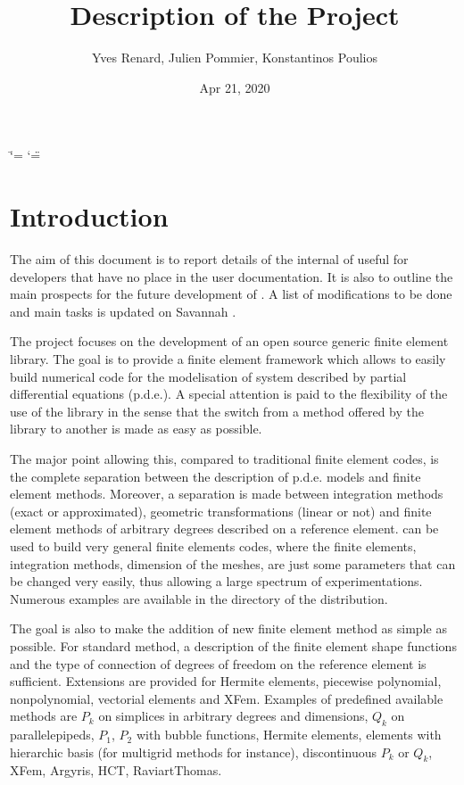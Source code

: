 \documentclass[a4paper,11pt,english]{sphinxmanual}
\title{Description of the Project}
\date{Apr 21, 2020}
\author{Yves Renard, Julien Pommier, Konstantinos Poulios}
\begin{document}
\ifdefined\shorthandoff
  \ifnum\catcode`\=\string=\active\shorthandoff{=}\fi
  \ifnum\catcode`\"=\active{}\fi
\fi

\pagestyle{empty}
\sphinxmaketitle
\pagestyle{plain}
\sphinxtableofcontents
\pagestyle{normal}
\label{\detokenize{project/index::doc}}



\chapter{Introduction}
\label{\detokenize{project/intro:introduction}}\label{\detokenize{project/intro:dp-intro}}\label{\detokenize{project/intro::doc}}
The aim of this document is to report details of the internal of 
useful for developers that have no place in the user documentation.
It is also to outline the main prospects for the future development
of . A list of modifications to be done and main tasks is updated
on Savannah .

The  project focuses on the development of an open source generic
finite element library.
The goal is to provide a finite element framework which allows to
easily build numerical code for the modelisation of system described
by partial differential equations (p.d.e.). A special attention is paid
to the flexibility of the use of the library in the sense that the
switch from a method offered by the library to another is made as easy
as possible.

The major point allowing this, compared to traditional finite element
codes, is the complete separation between the description of p.d.e.
models and finite element methods. Moreover, a separation is made
between integration methods (exact or approximated), geometric
transformations (linear or not) and finite element methods of
arbitrary degrees described on a reference element.  can
be used to build very general finite elements codes, where the
finite elements, integration methods, dimension of the meshes,
are just some parameters that can
be changed very easily, thus allowing a large spectrum of experimentations.
Numerous examples are available in the  directory of the
distribution.

The goal is also to make the addition of new finite element method
as simple as possible. For standard method, a description of the
finite element shape functions and the type of connection of degrees
of freedom on the reference element is sufficient. Extensions are
provided for Hermite elements, piecewise polynomial, non\sphinxhyphen{}polynomial,
vectorial elements and XFem. Examples of predefined
available methods are \(P_k\) on simplices in arbitrary degrees and
dimensions, \(Q_k\) on parallelepipeds, \(P_1\), \(P_2\)
with bubble functions, Hermite elements, elements with hierarchic
basis (for multigrid methods for instance),
discontinuous \(P_k\) or \(Q_k\), XFem, Argyris, HCT, Raviart\sphinxhyphen{}Thomas.
\end{document}
